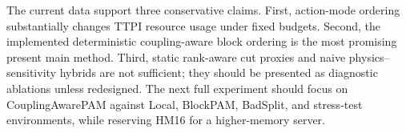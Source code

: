 The current data support three conservative claims. First, action-mode ordering
substantially changes TTPI resource usage under fixed budgets. Second, the
implemented deterministic coupling-aware block ordering is the most
promising present main method. Third, static rank-aware cut proxies and naive
physics--sensitivity hybrids are not sufficient; they should be presented as
diagnostic ablations unless redesigned. The next full experiment should focus
on CouplingAwarePAM against Local, BlockPAM, BadSplit, and stress-test
environments, while reserving HM16 for a higher-memory server.
